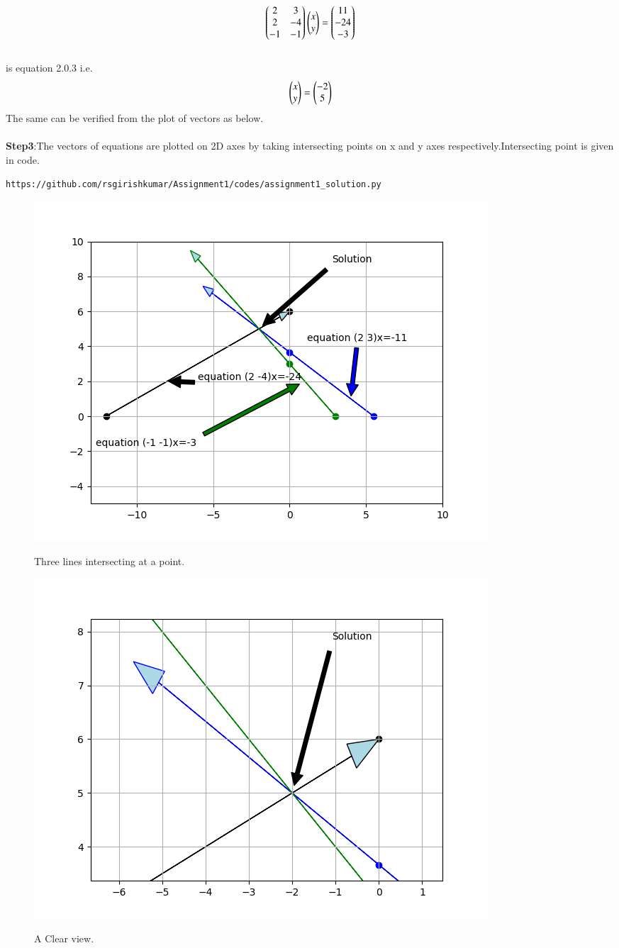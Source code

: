 \documentclass[journal,12pt,twocolumn]{IEEEtran}
\begin{document}
\begin{align*}
\begin{pmatrix}2 & 3\\2 & -4\\-1 & -1\end{pmatrix}
\begin{pmatrix}x\\y\end{pmatrix}=
\begin{pmatrix}11\\-24\\-3\end{pmatrix}
\end{align*}
\\is equation 2.0.3 i.e.
\begin{align*}
\begin{pmatrix}x\\y\end{pmatrix}=\begin{pmatrix}-2\\5\end{pmatrix}
\end{align*}
The same can be verified from the plot of vectors as below.\\
\\
\textbf{Step3}:The vectors of equations are plotted on 2D axes by taking intersecting points on x and y axes respectively.Intersecting point is given in code.\\
\begin{lstlisting}
https://github.com/rsgirishkumar/Assignment1/codes/assignment1_solution.py
\end{lstlisting}
\begin{figure}[htbp]
  \centering \includegraphics[width=\columnwidth]{assignment1solution_graph1.png}\label{fig0}
  \caption{Three lines intersecting at a point.}\label{cap2}
  \label{fig:Intersection point (-2,5)}
\end{figure} 
\begin{figure}[htbp]
  \centering \includegraphics[width=\columnwidth]{assignment1solution_graph.png}\label{fig1}
  \caption{A Clear view.}\label{cap1}
  \label{fig:Intersection point (-2,5)}
\end{figure} 
\end{document}

